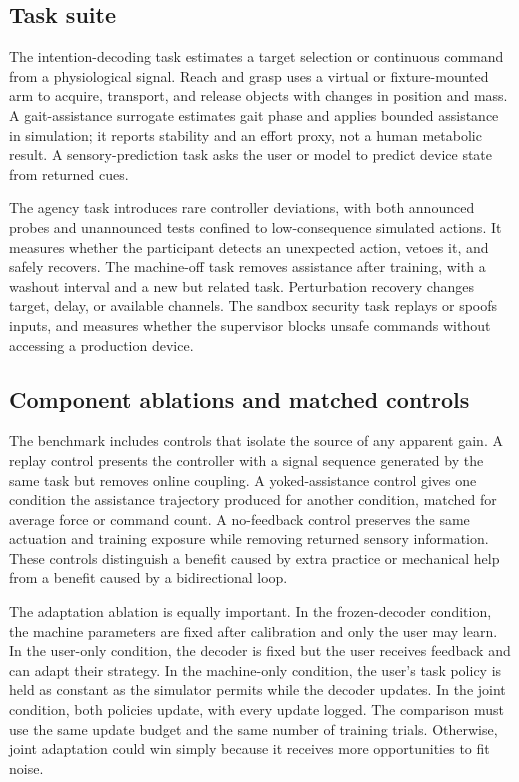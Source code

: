 \documentclass[conference]{IEEEtran}
\begin{document}
\subsection{Task suite}

The intention-decoding task estimates a target selection or continuous command from a physiological signal. Reach and grasp uses a virtual or fixture-mounted arm to acquire, transport, and release objects with changes in position and mass. A gait-assistance surrogate estimates gait phase and applies bounded assistance in simulation; it reports stability and an effort proxy, not a human metabolic result. A sensory-prediction task asks the user or model to predict device state from returned cues.

The agency task introduces rare controller deviations, with both announced probes and unannounced tests confined to low-consequence simulated actions. It measures whether the participant detects an unexpected action, vetoes it, and safely recovers. The machine-off task removes assistance after training, with a washout interval and a new but related task. Perturbation recovery changes target, delay, or available channels. The sandbox security task replays or spoofs inputs, and measures whether the supervisor blocks unsafe commands without accessing a production device.

\subsection{Component ablations and matched controls}

The benchmark includes controls that isolate the source of any apparent gain. A replay control presents the controller with a signal sequence generated by the same task but removes online coupling. A yoked-assistance control gives one condition the assistance trajectory produced for another condition, matched for average force or command count. A no-feedback control preserves the same actuation and training exposure while removing returned sensory information. These controls distinguish a benefit caused by extra practice or mechanical help from a benefit caused by a bidirectional loop.

The adaptation ablation is equally important. In the frozen-decoder condition, the machine parameters are fixed after calibration and only the user may learn. In the user-only condition, the decoder is fixed but the user receives feedback and can adapt their strategy. In the machine-only condition, the user's task policy is held as constant as the simulator permits while the decoder updates. In the joint condition, both policies update, with every update logged. The comparison must use the same update budget and the same number of training trials. Otherwise, joint adaptation could win simply because it receives more opportunities to fit noise.
\end{document}

